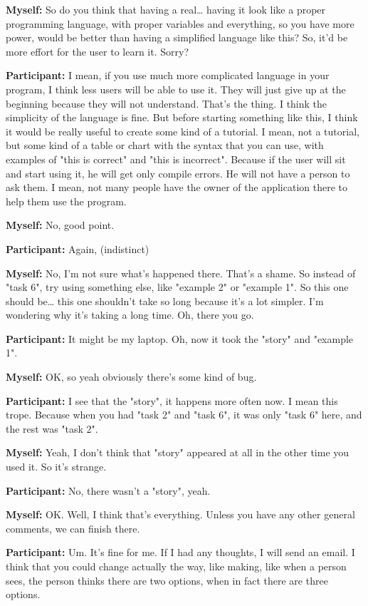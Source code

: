 \documentclass[11pt]{report}
\newcommand{\llabel}[1]{\hypertarget{llineno:#1}{\linelabel{#1}}}
\begin{document}
\begin{linenumbers}
\textbf{Myself:} So do you think that having a real\ldots{} having it look like a proper programming language, with proper variables and everything, so you have more power, would be better than having a simplified language like this? So, it'd be more effort for the user to learn it. Sorry?

\textbf{Participant:} I mean, if you use much more complicated language in your
program, I think less users will be able to use it. They will just give up at
the beginning because they will not understand. That's the thing. I think the
simplicity of the language is fine. But before starting something like this, I
think it would be really useful to create some kind of a tutorial. I mean, not a
tutorial, but some kind of a table or chart with the syntax that you can use,
with examples of "this is correct" and "this is incorrect". Because if the user
will sit and start using it, he will get only compile errors. He will not have a
person to ask them. I mean, not many people have the owner of the application
there to help them use the program.\llabel{lne:use1f2}

\textbf{Myself:} No, good point.

\textbf{Participant:} Again, (indistinct)

\textbf{Myself:} No, I'm not sure what's happened there. That's a shame. So instead of "task 6", try using something else, like "example 2" or "example 1". So this one should be\ldots{} this one shouldn't take so long because it's a lot simpler. I'm wondering why it's taking a long time. Oh, there you go.

\textbf{Participant:} It might be my laptop. Oh, now it took the "story" and "example 1".

\textbf{Myself:} OK, so yeah obviously there's some kind of bug.

\textbf{Participant:} I see that the "story", it happens more often now. I mean this trope. Because when you had "task 2" and "task 6", it was only "task 6" here, and the rest was "task 2".

\textbf{Myself:} Yeah, I don't think that "story" appeared at all in the other time you used it. So it's strange.

\textbf{Participant:} No, there wasn't a "story", yeah.

\textbf{Myself:} OK. Well, I think that's everything. Unless you have any other general comments, we can finish there.

\textbf{Participant:} Um. It's fine for me. If I had any thoughts, I will send an email. I think that you could change actually the way, like making, like when a person sees, the person thinks there are two options, when in fact there are three options.


\end{linenumbers}
\end{document}
